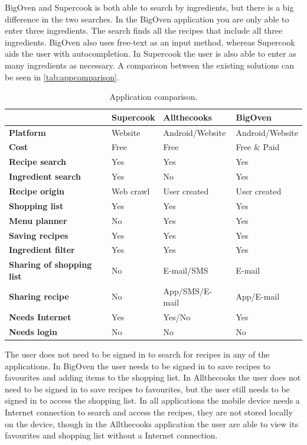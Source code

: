 BigOven and Supercook is both able to search by ingredients, but there is a big difference in the two searches. In the BigOven application you are only able to enter three ingredients. The search finds all the recipes that include all three ingredients. BigOven also uses free-text as an input method, whereas Supercook aids the user with autocompletion. In Supercook the user is also able to enter as many ingredients as necessary.
A comparison between the existing solutions can be seen in \autoref{tab:appcomparison}.
\begin{table}[H]
\centering
\begin{tabular}{|>{\bfseries}p{3.0cm}|l|l|l|}
\hline
 & \textbf{Supercook} & \textbf{Allthecooks} & \textbf{BigOven} \\
\hline
Platform & Website & Android/Website & Android/Website \\
\hline
Cost & Free & Free & Free \& Paid \\
\hline
Recipe search & Yes & Yes & Yes  \\
\hline
Ingredient search & Yes & No & Yes \\
\hline
Recipe origin & Web crawl & User created & User created \\
\hline
Shopping list & Yes & Yes & Yes \\
\hline
Menu planner & No & Yes & Yes \\
\hline
Saving recipes & Yes & Yes & Yes \\
\hline
Ingredient filter & Yes & Yes & Yes \\
\hline
Sharing of shopping list & No & E-mail/SMS & E-mail \\
\hline
Sharing recipe & No & App/SMS/E-mail & App/E-mail \\
\hline
Needs Internet & Yes & Yes/No & Yes \\
\hline
Needs login & No & No & No \\
\hline
\end{tabular}
\caption{Application comparison.}
\label{tab:appcomparison}
\end{table}
The user does not need to be signed in to search for recipes in any of the applications. 
In BigOven the user needs to be signed in to save recipes to favourites and adding items to the shopping list. 
In Allthecooks the user does not need to be signed in to save recipes to favourites, but the user still needs to be signed in to access the shopping list.  
In all applications the mobile device needs a Internet connection to search and access the recipes, they are not stored locally on the device, though in the Allthecooks application the user are able to view its favourites and shopping list without a Internet connection.

